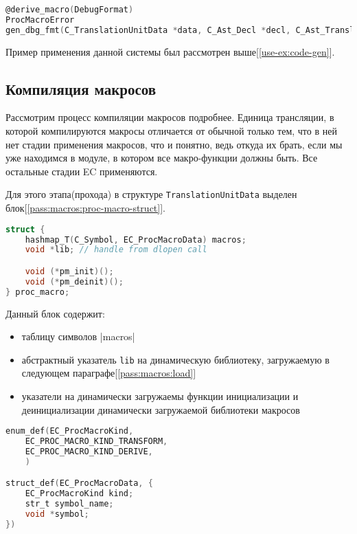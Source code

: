 \begin{lstlisting}[language=c, caption={Заголовок функции gen\_dbg\_fmt}, label={pass:macros:macro-sym-diff}]
@derive_macro(DebugFormat)
ProcMacroError
gen_dbg_fmt(C_TranslationUnitData *data, C_Ast_Decl *decl, C_Ast_TranslationUnit **out_node);
\end{lstlisting}

Пример применения данной системы был рассмотрен выше[\ref{use-ex:code-gen}].


\subsection{Компиляция макросов}
\label{pass:macros:compile}
Рассмотрим процесс компиляции макросов подробнее.
Единица трансляции, в которой компилируются макросы отличается от обычной только тем, что в ней нет стадии применения макросов, 
что и понятно, ведь откуда их брать, если мы уже находимся в модуле, в котором все макро-функции должны быть. Все остальные стадии EC применяются.

Для этого этапа(прохода) в структуре \verb|TranslationUnitData| выделен блок[\ref{pass:macros:proc-macro-struct}].

\begin{lstlisting}[language=c, caption={Блок отвечающий за макро-функции}, label={pass:macros:proc-macro-struct}]
struct {
    hashmap_T(C_Symbol, EC_ProcMacroData) macros;
    void *lib; // handle from dlopen call

    void (*pm_init)();
    void (*pm_deinit)();
} proc_macro;
\end{lstlisting}

Данный блок содержит:
\begin{itemize}
    \item таблицу символов |macros|
    \item абстрактный указатель \verb|lib| на динамическую библиотеку, загружаемую в следующем параграфе[\ref{pass:macros:load}]
    \item указатели на динамически загружаемы функции инициализации и деинициализации динамически загружаемой библиотеки макросов
\end{itemize}


\begin{lstlisting}[language=c, caption={Структура содержащая информацию о символе макро-функции}, label={pass:macros:proc-macro-data-struct}]
enum_def(EC_ProcMacroKind,
    EC_PROC_MACRO_KIND_TRANSFORM,
    EC_PROC_MACRO_KIND_DERIVE,
    )

struct_def(EC_ProcMacroData, {
    EC_ProcMacroKind kind;
    str_t symbol_name;
    void *symbol;
})
\end{lstlisting}

